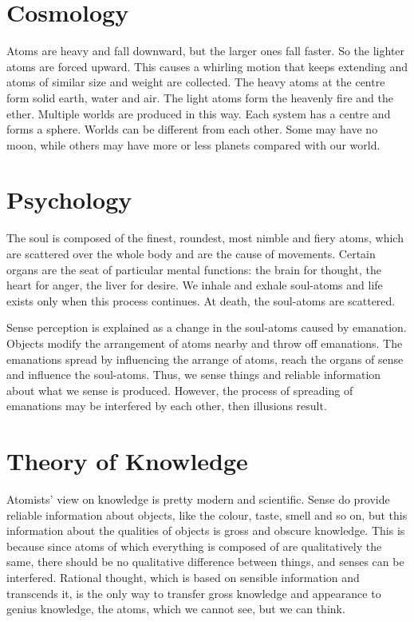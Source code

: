 \documentclass[11pt]{article}
\begin{document}
\begin{sloppypar}
\section{Cosmology}
Atoms are heavy and fall downward, but the larger ones fall faster. 
So the lighter atoms are forced upward. 
This causes a whirling motion that keeps extending and atoms of similar size and weight are collected. 
The heavy atoms at the centre form solid earth, water and air. 
The light atoms form the heavenly fire and the ether. 
Multiple worlds are produced in this way. 
Each system has a centre and forms a sphere. 
Worlds can be different from each other. 
Some may have no moon, while others may have more or less planets compared with our world. 
  
\section{Psychology}
The soul is composed of the finest, roundest, most nimble and fiery atoms, which are scattered over the whole body and are the cause of movements. 
Certain organs are the seat of particular mental functions: 
the brain for thought, the heart for anger, the liver for desire. 
We inhale and exhale soul-atoms and life exists only when this process continues. 
At death, the soul-atoms are scattered.

\newline

Sense perception is explained as a change in the soul-atoms caused by emanation. 
Objects modify the arrangement of atoms nearby and throw off emanations. 
The emanations spread by influencing the arrange of atoms, reach the organs of sense and influence the soul-atoms. 
Thus, we sense things and reliable information about what we sense is produced. 
However, the process of spreading of emanations may be interfered by each other, then illusions result.
  
\section{Theory of Knowledge}
Atomists’ view on knowledge is pretty modern and scientific. 
Sense do provide reliable information about objects, like the colour, taste, smell and so on, but this information about the qualities of objects is gross and obscure knowledge. 
This is because since atoms of which everything is composed of are qualitatively the same, there should be no qualitative difference between things, and senses can be interfered. 
Rational thought, which is based on sensible information and transcends it, is the only way to transfer gross knowledge and appearance to genius knowledge, the atoms, which we cannot see, but we can think. 
  

\end{sloppypar}
\end{document}
